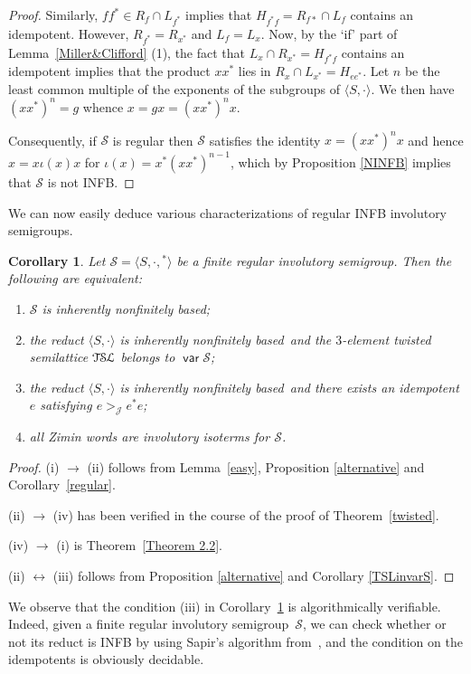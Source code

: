 \documentclass[11pt,reqno]{amsart}
\def\Jc{\mathrel{\mathscr{J}}}
\newcommand{\is}{involutory semi\-group}
\newcommand{\iss}{involutory semi\-groups}
\newcommand{\infb}{inherently non\-finitely based}
\newcommand{\TSL}{\ensuremath{\mathcal{T\kern-.5pt S\kern-.5pt L}}}
\newtheorem{Cor}[Thm]{Corollary}
\DeclareMathOperator{\var}{\mathsf{var}}
\begin{document}
\begin{proof}
Similarly, $ff^*\in R_f\cap L_{f^*}$ implies that $H_{f^*f}=R_{f*}\cap L_f$ contains an idempotent. However, $R_{f^*}=R_{x^*}$ and
$L_f=L_x$. Now, by the `if' part of Lemma~\ref{Miller&Clifford} (1), the fact that $L_x\cap R_{x^*}=H_{f^*f}$ contains an idempotent implies
that the product $xx^*$ lies in $R_x\cap L_{x^*}=H_{ee^*}$. Let $n$ be the least common multiple of the exponents of the subgroups of $\langle
S,\cdot\rangle$. We then have $(xx^*)^n=g$ whence $x=gx=(xx^*)^nx$.

Consequently, if $\mathcal{S}$ is regular then $\mathcal{S}$ satisfies the identity $x=(xx^*)^nx$ and hence
$x=x\iota\!(x)x$ for $\iota\!(x)=x^*(xx^*)^{n-1}$, which by Proposition \ref{NINFB} implies that $\mathcal{S}$ is not INFB.
\end{proof}


We can now easily deduce various characterizations of regular INFB \iss.
\renewcommand{\labelenumi}{\emph{(\roman{enumi})}}
\begin{Cor}
\label{characterization} Let $\mathcal{S}=\langle S,\cdot,{}^*\rangle$ be a finite regular \is. Then the following are equivalent:
\begin{enumerate}
\item $\mathcal{S}$ is \infb;
\item the reduct $\langle S,\cdot\rangle$ is \infb\ and the $3$-element twisted semilattice $\TSL$ belongs to $\var\mathcal{S}$;
\item the reduct $\langle S,\cdot\rangle$ is \infb\ and there exists an idempotent $e$ satisfying $e\mathrel{{>}_{\!\!\!\Jc}} e^*e$;
\item all Zimin words are involutory isoterms for $\mathcal{S}$.
\end{enumerate}
\end{Cor}

\begin{proof}
(i) $\to$ (ii) follows from Lemma~\ref{easy}, Proposition \ref{alternative} and Corollary~\ref{regular}.

(ii) $\to$ (iv) has been verified in the course of the proof of Theorem~\ref{twisted}.

(iv) $\to$ (i) is Theorem~\ref{Theorem 2.2}.

(ii) $\leftrightarrow$ (iii) follows from Proposition \ref{alternative} and Corollary \ref{TSLinvarS}.
\end{proof}

We observe that the condition (iii) in Corollary~\ref{characterization} is algorithmically verifiable. Indeed, given a finite
regular \is\ $\mathcal{S}$, we can check whether or not its reduct is INFB by using Sapir's algorithm from~\cite{Sapir:1987},
and the condition on the idempotents is obviously decidable.
\end{document}
